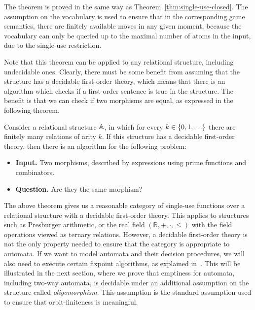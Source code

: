 The theorem is proved in the same way as Theorem~\ref{thm:single-use-closed}.  The assumption on the vocabulary is used to ensure that in the corresponding game semantics, there are finitely available moves in any given moment, because the vocabulary can only be queried up to the maximal number of atoms in the input, due to the single-use restriction.

Note that this  theorem can be applied to any relational structure, including undecidable ones. Clearly, there must be some benefit from assuming that the structure has a decidable first-order theory, which means that there is an algorithm which checks if a first-order sentence is true in the structure. 
The benefit is that we can check if two morphisms are equal, as expressed in the following theorem. 

\begin{theorem}\label{thm:first-order-decidable}
    Consider a relational structure $\mathbb A$, in which for every $k \in \{0,1,\ldots\}$ there are finitely many relations of arity $k$. If this structure has a decidable first-order theory, then there is an algorithm for the following problem:
    \begin{itemize}
        \item {\bf Input.} Two morphisms, described by expressions using prime functions and combinators.
        \item {\bf Question.} Are they the same morphism?
    \end{itemize}
\end{theorem}




The above theorem gives us a reasonable category of single-use functions over a relational structure with a decidable first-order theory. This applies to structures such as Presburger arithmetic, or the real field $(\mathbb R, +, \cdot, \leq)$ with the field operations viewed as ternary relations. 
However, a decidable first-order theory is not the only property needed to ensure that the category is appropriate to automata. If we want to model automata and their decision procedures, we will also need to execute certain fixpoint algorithms, as explained in~\cite{bojanczyk_slightly2018}. This will be illustrated in the next section, where we prove that emptiness for automata, including two-way automata, is decidable under an additional assumption on the structure called \emph{oligomorphism}. This assumption is the standard assumption used to ensure that orbit-finiteness is meaningful. 


